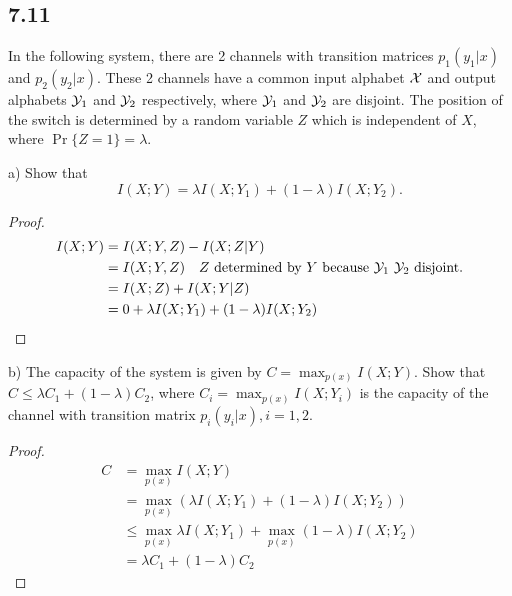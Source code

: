 \documentclass[../main.tex]{subfiles}
\begin{document}
\subsection*{7.11}
In the following system, there are 2 channels with transition matrices $p_1(y_1|x)$ and $p_2(y_2|x)$. These 2 channels have a common input alphabet $\mathcal{X}$ and output alphabets $\mathcal{Y}_1$ and $\mathcal{Y}_2$ respectively, where $\mathcal{Y}_1$ and $\mathcal{Y}_2$ are disjoint. The position of the switch is determined by a random variable $Z$ which is independent of $X$, where $\Pr\{Z=1\}=\lambda$.
\newline
a) Show that \[
I(X;Y)=\lambda I(X;Y_1) + (1-\lambda)I(X;Y_2).
\]
\begin{proof}
    \begin{align*}
        I(X;Y) &= I(X;Y,Z)-I(X;Z|Y)\\
        &=I(X;Y,Z) \quad \text{$Z$ determined by $Y$ because $\mathcal{Y}_1$ $\mathcal{Y}_2$ disjoint.}\\
        &= I(X;Z) + I(X;Y|Z)\\
        &=0+ \lambda I(X;Y_1) + (1-\lambda) I(X;Y_2)
    \end{align*}
\end{proof}
b) The capacity of the system is given by $C=\max_{p(x)}I(X;Y)$. Show that $C\leq \lambda C_1 + (1-\lambda) C_2$, where $C_i=\max_{p(x)}I(X;Y_i)$ is the capacity of the channel with transition matrix $p_i(y_i|x), i=1,2$.
\begin{proof}
    \begin{align*}
        C&= \max_{p(x)}I(X;Y)\\
        &= \max_{p(x)}(\lambda I(X;Y_1) + (1-\lambda)I(X;Y_2))\\
        &\leq \max_{p(x)}\lambda I(X;Y_1) + \max_{p(x)}(1-\lambda)I(X;Y_2)\\
        &= \lambda C_1 + (1-\lambda) C_2
    \end{align*}
\end{proof}
\end{document}
